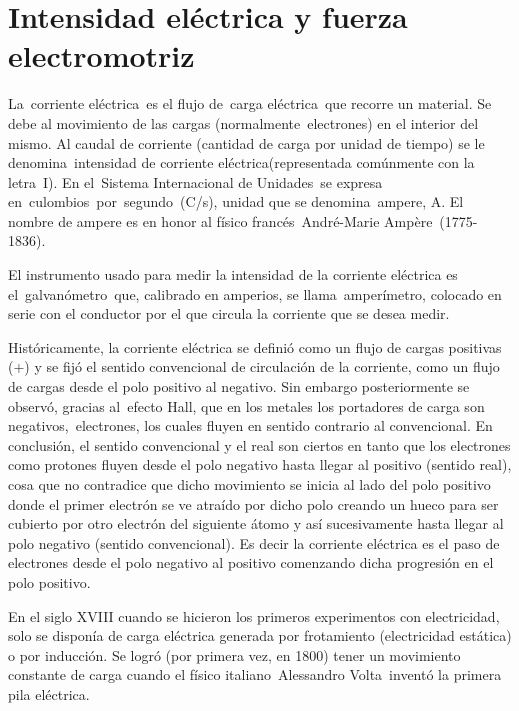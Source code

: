 \chapter{Intensidad eléctrica y fuerza electromotriz}

\begin{miparrafo}
La corriente eléctrica es el flujo de carga eléctrica que recorre un material. Se debe al movimiento de las cargas (normalmente electrones) en el interior del mismo. Al caudal de corriente (cantidad de carga por unidad de tiempo) se le denomina intensidad de corriente eléctrica(representada comúnmente con la letra I). En el Sistema Internacional de Unidades se expresa en culombios por segundo (C/s), unidad que se denomina ampere, A. El nombre de ampere es en honor al físico francés André-Marie Ampère (1775-1836). 

El instrumento usado para medir la intensidad de la corriente eléctrica es el galvanómetro que, calibrado en amperios, se llama amperímetro, colocado en serie con el conductor por el que circula la corriente que se desea medir.


Históricamente, la corriente eléctrica se definió como un flujo de cargas positivas (+) y se fijó el sentido convencional de circulación de la corriente, como un flujo de cargas desde el polo positivo al negativo. Sin embargo posteriormente se observó, gracias al efecto Hall, que en los metales los portadores de carga son negativos, electrones, los cuales fluyen en sentido contrario al convencional. En conclusión, el sentido convencional y el real son ciertos en tanto que los electrones como protones fluyen desde el polo negativo hasta llegar al positivo (sentido real), cosa que no contradice que dicho movimiento se inicia al lado del polo positivo donde el primer electrón se ve atraído por dicho polo creando un hueco para ser cubierto por otro electrón del siguiente átomo y así sucesivamente hasta llegar al polo negativo (sentido convencional). Es decir la corriente eléctrica es el paso de electrones desde el polo negativo al positivo comenzando dicha progresión en el polo positivo.

En el siglo XVIII cuando se hicieron los primeros experimentos con electricidad, solo se disponía de carga eléctrica generada por frotamiento (electricidad estática) o por inducción. Se logró (por primera vez, en 1800) tener un movimiento constante de carga cuando el físico italiano Alessandro Volta inventó la primera pila eléctrica.
\end{miparrafo}

